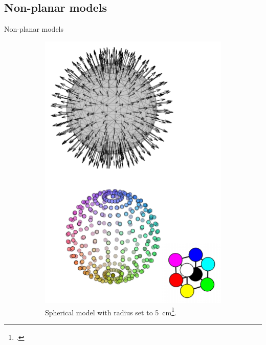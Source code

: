 \documentclass[xcolor=dvipsnames,10pt]{beamer}
\begin{document}
\subsection{Non-planar models}
\begin{frame}{Non-planar models}        
    \begin{figure}
     \centering
     \begin{subfigure}[b]{0.3\textwidth}
         \centering
         \includegraphics[width=\textwidth]{figures/canonical_tissue_models.sphere.pdf}
         \caption{Spherical model with radius set to \SI{5}{\cm}\footcite{Kapetanovic2022AssessmentTEMC}.}
     \end{subfigure}
     \hfill
     \begin{subfigure}[b]{0.3\textwidth}
         \centering

\end{subfigure}
\end{figure}
\end{frame}
\end{document}
